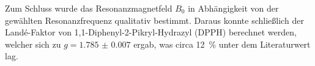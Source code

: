\documentclass[ngerman]{scrartcl}
\begin{document}
Zum Schluss wurde das Resonanzmagnetfeld $B_0$ in Abhängigkeit von der gewählten Resonanzfrequenz qualitativ bestimmt. Daraus konnte schließlich der Landé-Faktor von 1,1-Diphenyl-2-Pikryl-Hydrazyl (DPPH) berechnet werden, welcher sich zu $g = \num{1.785(7)}$ ergab, was circa \SI{12}{\percent} unter dem Literaturwert lag.



\clearpage
\printbibliography

\listoffigures

\listoftables
\end{document}
